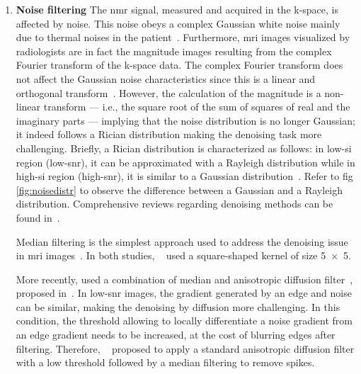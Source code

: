 \begin{enumerate}[leftmargin=*]
\item[] \textbf{Noise filtering}
The \ac{nmr} signal, measured and acquired in the k-space, is affected by noise.
This noise obeys a complex Gaussian white noise mainly due to thermal noises in
the patient~\cite{Nowak1999}.
Furthermore, \ac{mri} images visualized by radiologists are in fact the
magnitude images resulting from the complex Fourier transform of the k-space
data.
The complex Fourier transform does not affect the Gaussian noise
characteristics since this is a linear and orthogonal
transform~\cite{Nowak1999}.
However, the calculation of the magnitude is a non-linear transform --- i.e.,
the square root of the sum of squares of real and the imaginary parts ---
implying that the noise distribution is no longer Gaussian; it indeed follows a
Rician distribution making the denoising task more challenging.
Briefly, a Rician distribution is characterized as follows: in low-\ac{si}
region (low-\ac{snr}), it can be approximated with a Rayleigh distribution
while in high-\ac{si} region (high-\ac{snr}), it is similar to a Gaussian
distribution~\cite{Manjon2008}.
Refer to \acs{fig}\,\ref{fig:noisedistr} to observe the difference between a
Gaussian and a Rayleigh distribution.
Comprehensive reviews regarding denoising methods can be found
in~\cite{Buades2005,Mohan2014}.

Median filtering is the simplest approach used to address the denoising issue
in \ac{mri} images~\cite{Ozer2009,Ozer2010}.
In both studies, \citeauthor{Ozer2010}~\cite{Ozer2009,Ozer2010} used a
square-shaped kernel of size \SI[product-units=repeat]{5x5}{\px}.

More recently, \citeauthor{rampun2016quantitative} used a combination of median
and anisotropic diffusion
filter~\cite{rampun2015classifying,rampun2016computer,rampun2016computerb,rampun2016quantitative},
proposed in~\cite{ling2002smoothing}.
In low-\ac{snr} images, the gradient generated by an edge and noise can be
similar, making the denoising by diffusion more challenging.
In this condition, the threshold allowing to locally differentiate a noise
gradient from an edge gradient needs to be increased, at the cost of blurring
edges after filtering.
Therefore, \citeauthor{ling2002smoothing}~\cite{ling2002smoothing} proposed to
apply a standard anisotropic diffusion filter with a low threshold followed by
a median filtering to remove spikes.




\end{enumerate}
